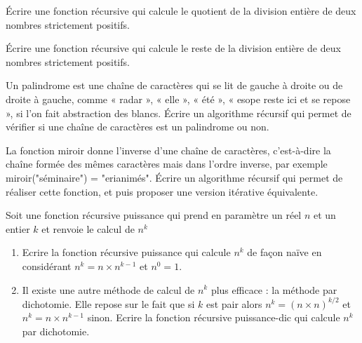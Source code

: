 \documentclass[12pt,fleqn]{article} %
\begin{document}
\begin{exercise}
	Écrire une fonction récursive qui calcule le quotient de la division entière de deux nombres strictement positifs.
\end{exercise}

\begin{exercise}
	Écrire une fonction récursive qui calcule le reste de la division entière de deux nombres strictement positifs.
\end{exercise}

\begin{exercise}
	Un palindrome est une chaîne de caractères qui se lit de gauche à droite ou de droite à gauche, comme « radar », « elle », « été », « esope reste ici et se repose », si l’on fait abstraction des blancs. Écrire un algorithme récursif qui permet de vérifier si une chaîne de caractères est un palindrome ou non.
\end{exercise}

\begin{exercise}
	La fonction miroir donne l’inverse d’une chaîne de caractères, c’est-à-dire la chaîne formée des mêmes caractères mais dans l’ordre inverse, par exemple
	miroir("séminaire") = "erianimés". Écrire un algorithme récursif qui permet de réaliser cette fonction, et puis proposer une version itérative équivalente.
\end{exercise}

\begin{exercise}
	Soit une fonction récursive puissance qui prend en paramètre un réel $n$ et un entier $k$ et
	renvoie le calcul de $n^k$
	\begin{enumerate}
		\item Ecrire la fonction récursive puissance qui calcule $n^k$ de façon naïve en considérant $n^k = n\times n^{k-1}$ et $n^0 = 1$.
		\item Il existe une autre méthode de calcul de $n^k$ plus efficace : la méthode par dichotomie. Elle repose sur le fait que si $k$ est pair alors $n^k = (n \times n)^{k/2}$ et $n^k = n\times n^{k-1}$ sinon. Ecrire la fonction récursive puissance-dic qui calcule $n^k$ par dichotomie.
	\end{enumerate}
\end{exercise}
\end{document}
